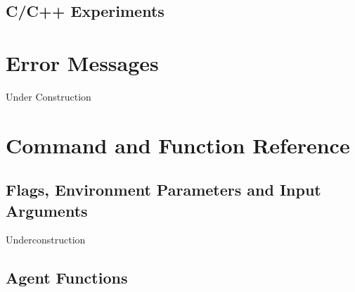 \documentclass[11pt]{article}
\begin{document}
\subsection{C/C++ Experiments}
\label{exp3}





\section{Error Messages}
\label{error}
Under Construction
\section{Command and Function Reference}
\label{ref}
\subsection{Flags, Environment Parameters and Input Arguments}
Underconstruction
\subsection{Agent Functions}
 
\end{document}
